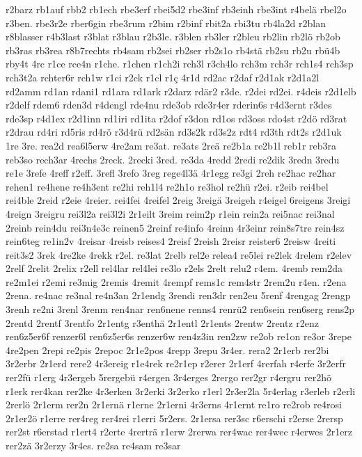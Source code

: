 {r2barz
rb1auf
rbb2
rb1ech
rbe3erf
rbei5d2
rbe3inf
rb3einh
rbe3int
r4belä
rbel2o
r3ben.
rbe3r2e
rber6gin
rbe3rum
r2bim
r2binf
rbit2a
rbi3tu
rb4la2d
r2blan
r8blasser
r4b3last
r3blat
r3blau
r2b3le.
r3blen
rb3ler
r2bleu
rb2lin
rb2lö
rb2ob
rb3ras
rb3rea
r8b7rechts
rb4sam
rb2sei
rb2ser
rb2s1o
rb4stä
rb2su
rb2u
rbü4b
rby4t
4rc
r1ce
rce4n
r1che.
r1chen
r1ch2i
rch3l
r3ch4lo
rch3m
rch3r
rch1s4
rch3sp
rch3t2a
rchter6r
rch1w
r1ci
r2ck
r1cl
r1ç
4r1d
rd2ac
r2daf
r2d1ak
r2d1a2l
rd2amm
rd1an
rdani1
rd1ara
rd1ark
r2darz
rdär2
r3de.
r2dei
rd2ei.
r4deis
r2d1elb
r2delf
rdem6
rden3d
r4dengl
rde4nu
rde3ob
rde3r4er
rderin6s
r4d3ernt
r3des
rde3sp
r4d1ex
r2d1inn
rd1iri
rd1ita
r2dof
r3don
rd1os
rd3oss
rdo4st
r2dö
rd3rat
r2drau
rd4ri
rd5ris
rd4rö
r3d4rü
rd2sän
rd3s2k
rd3s2z
rdt4
rd3th
rdt2s
r2d1uk
1re
3re.
rea2d
rea6l5erw
4re2am
re3at.
re3ats
2reä
re2b1a
re2b1l
reb1r
reb3ra
reb3so
rech3ar
4rechs
2reck.
2recki
3red.
re3da
4redd
2redi
re2dik
3redn
3redu
re1e
3refe
4reff
r2eff.
3refl
3refo
3reg
rege4l3ä
4r1egg
re3gi
2reh
re2hac
re2har
rehen1
re4hene
re4h3ent
re2hi
reh1l4
re2h1o
re3hol
re2hü
r2ei.
r2eib
rei4bel
rei4ble
2reid
r2eie
4reier.
rei4fei
4reifel
2reig
3reigä
3reigeh
r4eigel
6reigens
3reigi
4reign
3reigru
rei3l2a
rei3l2i
2r1eilt
3reim
reim2p
r1ein
rein2a
rei5nac
rei3nal
2reinb
rein4du
rei3n4e3c
reinen5
2reinf
re4info
4reinn
4r3einr
rein8s7tre
rein4sz
rein6teg
re1in2v
4reisar
4reisb
reises4
2reisf
2reish
2reisr
reister6
2reisw
4reiti
reit3s2
3rek
4re2ke
4rekk
r2el.
re3lat
2relb
rel2e
relea4
re5lei
re2lek
4relem
r2elev
2relf
2relit
2relix
r2ell
rel4lar
rel4lei
re3lo
r2els
2relt
relu2
r4em.
4remb
rem2da
re2m1ei
r2emi
re3mig
2remis
4remit
4rempf
rems1c
rem4str
2rem2u
r4en.
r2ena
2rena.
re4nac
re3nal
re4n3an
2r1endg
3rendi
ren3dr
ren2eu
5renf
4rengag
2rengp
3renh
re2ni
3renl
3renm
ren4nar
ren6nene
renns4
renrü2
ren6sein
ren6serg
rens2p
2rentd
2rentf
3rentfo
2r1entg
r3enthä
2r1entl
2r1ents
2rentw
2rentz
r2enz
ren6z5er6f
renzer6l
ren6z5er6s
renzer6w
ren4z3in
ren2zw
re2ob
re1on
re3or
3repe
4re2pen
2repi
re2pis
2repoc
2r1e2pos
4repp
3repu
3r4er.
rera2
2r1erb
rer2bi
3r2erbr
2r1erd
rere2
4r3ereig
r1e4rek
re2r1ep
r2erer
2r1erf
4rerfah
r4erfe
3r2erfr
rer2fü
r1erg
4r3ergeb
5rergebü
r4ergen
3r4erges
2rergo
rer2gr
r4ergru
rer2hö
r1erk
rer4kan
rer2ke
4r3erken
3r2erki
3r2erko
r1erl
2r3er2la
5r4erlag
r3erleb
r2erli
2rerlö
2r1erm
rer2n
2r1ernä
r1erne
2r1erni
4r3erns
4r1ernt
re1ro
re2rob
re4rosi
2r1er2ö
r1erre
rer4reg
rer4rei
r1erri
5r2ers.
2r1ersa
rer3sc
r6erschi
r2erse
2rersp
rer2st
r6erstad
r1ert4
r2erte
4rerträ
r1erw
2rerwa
rer4wac
rer4wec
r4erwes
2r1erz
rer2zä
3r2erzy
3r4es.
re2sa
re4sam
re3sar
}
